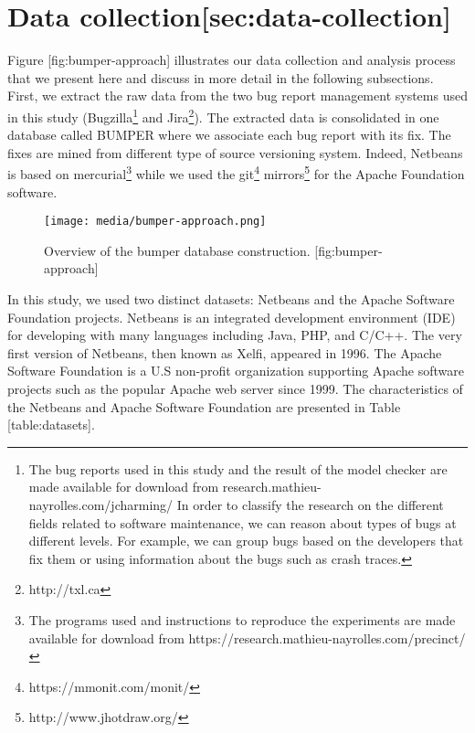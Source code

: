 \section{Data
collection{[}sec:data-collection{]}}\label{data-collectionsecdata-collection}

Figure {[}fig:bumper-approach{]} illustrates our data collection and
analysis process that we present here and discuss in more detail in the
following subsections. First, we extract the raw data from the two bug
report management systems used in this study (Bugzilla\footnote{The bug
  reports used in this study and the result of the model checker are
  made available for download from research.mathieu-
  nayrolles.com/jcharming/ In order to classify the research on the
  different fields related to software maintenance, we can reason about
  types of bugs at different levels. For example, we can group bugs
  based on the developers that fix them or using information about the
  bugs such as crash traces.} and Jira\footnote{http://txl.ca}). The
extracted data is consolidated in one database called BUMPER where we
associate each bug report with its fix. The fixes are mined from
different type of source versioning system. Indeed, Netbeans is based on
mercurial\footnote{The programs used and instructions to reproduce the
  experiments are made available for download from
  https://research.mathieu-nayrolles.com/precinct/} while we used the
git\footnote{https://mmonit.com/monit/} mirrors\footnote{http://www.jhotdraw.org/}
for the Apache Foundation software.

\begin{figure}[htbp]
\centering
\texttt{[image: media/bumper-approach.png]}
\caption{Overview of the bumper database construction.
{[}fig:bumper-approach{]}}
\end{figure}

In this study, we used two distinct datasets: Netbeans and the Apache
Software Foundation projects. Netbeans is an integrated development
environment (IDE) for developing with many languages including Java,
PHP, and C/C++. The very first version of Netbeans, then known as Xelfi,
appeared in 1996. The Apache Software Foundation is a U.S non-profit
organization supporting Apache software projects such as the popular
Apache web server since 1999. The characteristics of the Netbeans and
Apache Software Foundation are presented in Table {[}table:datasets{]}.

